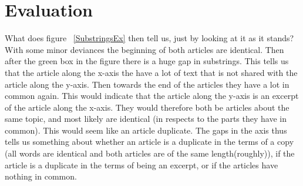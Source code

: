 \chapter{Evaluation}

What does figure ~\ref{SubstringsEx} then tell us, just by looking at it as it stands? With some minor deviances the beginning of both articles are identical. Then after the green box in the figure there is a huge gap in substrings. This tells us that the article along the x-axis the have a lot of text that is not shared with the article along the y-axis. Then towards the end of the articles they have a lot in common again. This would indicate that the article along the y-axis is an excerpt of the article along the x-axis. They would therefore both be articles about the same topic, and most likely are identical (in respects to the parts they have in common). This would seem like an article duplicate. The gaps in the axis thus tells us something about whether an article is a duplicate in the terms of a copy (all words are identical and both articles are of the same length(roughly)), if the article is a duplicate in the terms of being an excerpt, or if the articles have nothing in common.